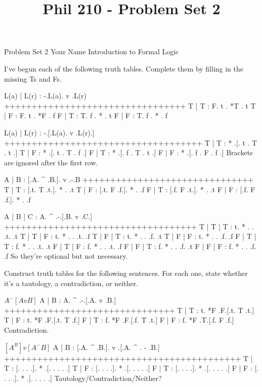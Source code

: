 
\title{Phil 210 - Problem Set 2}

\heading
Problem Set 2
Your Name
Introduction to Formal Logic
\endheading

I've begun each of the following truth tables. Complete them by filling in the missing Ts and Fs.

\problems
{}
\truthtable
 L(a) | L(r) : -.L(a).  v  .L(r)
+++++++++++++++++++++++++++++++++
  T   |  T   : F. t  . *T  . t
  T   |  F   : F. t  . *F  . f
  F   |  T   : T. f  . *   . t
  F   |  F   : T. f  . *   . f
\endtruthtable

\truthtable
 L(a) | L(r) :  -.[.L(a). v .L(r).]
++++++++++++++++++++++++++++++++++++
  T   |  T   : * .[. t  . T . t  .]
  T   |  F   : * .[. t  . T . f  .]
  F   |  T   : * .[. f  . T . t  .]
  F   |  F   : * .[. f  . F . f  .]
\endtruthtable
\Hint Brackets are ignored after the first row.

\truthtable
 A | B : [.A. ^ .B.].  v  .-.B
+++++++++++++++++++++++++++++++
 T | T : [.t. T .t.]. *   . .t
 T | F : [.t. F .f.]. *   . .f
 F | T : [.f. F .t.]. *   . .t
 F | F : [.f. F .f.]. *   . .f
\endtruthtable

\truthtable
 A | B | C : A.  ^  .-.[.B. v .C.]
+++++++++++++++++++++++++++++++++++
 T | T | T : t. *   . . .t.   .t
 T | T | F : t. *   . . .t.   .f
 T | F | T : t. *   . . .f.   .t
 T | F | F : t. *   . . .f.   .f
 F | T | T : f. *   . . .t.   .t
 F | T | F : f. *   . . .t.   .f
 F | F | T : f. *   . . .f.   .t
 F | F | F : f. *   . . .f.   .f
\endtruthtable
\Hint So they're optional but not necessary.

\endproblems
\pagebreak

Construct truth tables for the following sentences. For each one, state whether it's a tautology, a contradiction, or neither.

\problems
{}
$ A ^ -[A v B] $
        \answer
        \truthtable
         A | B : A.  ^  .-.[.A. v .B.]
        +++++++++++++++++++++++++++++++
         T | T : t. *F  .F.[.t. T .t.]
         T | F : t. *F  .F.[.t. T .f.]
         F | T : f. *F  .F.[.f. T .t.]
         F | F : f. *F  .T.[.f. F .f.]
        \endtruthtable
        Contradiction.
        \endanswer

$ [A ^ B] v [A ^ -B] $
        \answer
        \truthtable
         A | B : [.A. ^ .B.].  v  .[.A. ^ . - .B.]
        +++++++++++++++++++++++++++++++++++++++++++
         T | T : [. .   . .]. *   .[. .   .   . .]
         T | F : [. .   . .]. *   .[. .   .   . .]
         F | T : [. .   . .]. *   .[. .   .   . .]
         F | F : [. .   . .]. *   .[. .   .   . .]
        \endtruthtable
        Tautology/Contradiction/Neither?
        \endanswer

